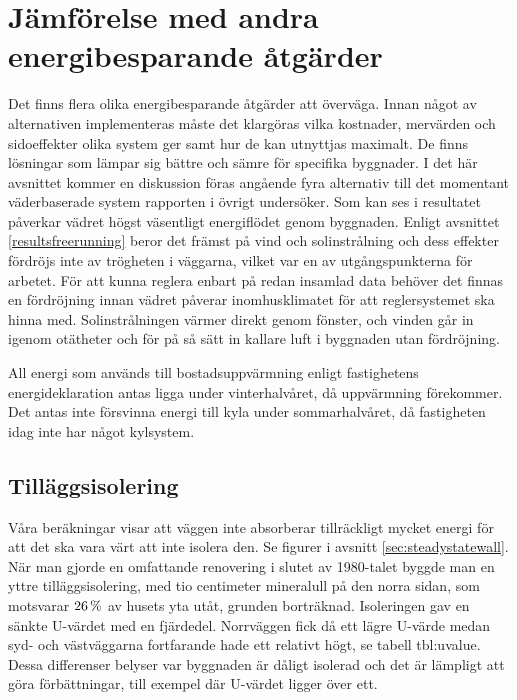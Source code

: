 \section{Jämförelse med andra energibesparande åtgärder}

Det finns flera olika energibesparande åtgärder att överväga. Innan något av alternativen implementeras måste det klargöras vilka kostnader, mervärden och sidoeffekter olika system ger samt hur de kan utnyttjas maximalt. De finns lösningar som lämpar sig bättre och sämre för specifika byggnader. I det här avsnittet kommer en diskussion föras angående fyra alternativ till det momentant väderbaserade system rapporten i övrigt undersöker.
Som kan ses i resultatet påverkar vädret högst väsentligt energiflödet genom byggnaden. Enligt avsnittet \ref{resultsfreerunning} beror det främst på vind och solinstrålning och dess effekter fördröjs inte av trögheten i väggarna, vilket var en av utgångspunkterna för arbetet. För att kunna reglera enbart på redan insamlad data behöver det finnas en fördröjning innan vädret påverar inomhusklimatet för att reglersystemet ska hinna med. Solinstrålningen värmer direkt genom fönster, och vinden går in igenom otätheter och för på så sätt in kallare luft i byggnaden utan fördröjning.

All energi som används till bostadsuppvärmning enligt fastighetens energideklaration\cite{energideklaration} antas ligga under vinterhalvåret, då uppvärmning förekommer. Det antas inte försvinna energi till kyla under sommarhalvåret, då fastigheten idag inte har något kylsystem.

\subsection{Tilläggsisolering}
Våra beräkningar visar att väggen inte absorberar tillräckligt mycket energi för att det ska vara värt att inte isolera den. Se figurer i avsnitt \ref{sec:steadystatewall}.
När man gjorde en omfattande renovering i slutet av 1980-talet byggde man en yttre tilläggsisolering, med tio centimeter mineralull på den norra sidan\cite{arsredovisning}, som motsvarar $\unit[26]{\%}$ av husets yta utåt, grunden borträknad. Isoleringen gav en sänkte U-värdet med en fjärdedel. Norrväggen fick då ett lägre U-värde medan syd- och västväggarna fortfarande hade ett relativt högt, se tabell {tbl:uvalue}.
Dessa differenser belyser var byggnaden är dåligt isolerad och det är lämpligt att göra förbättningar, till exempel där U-värdet ligger över ett.

